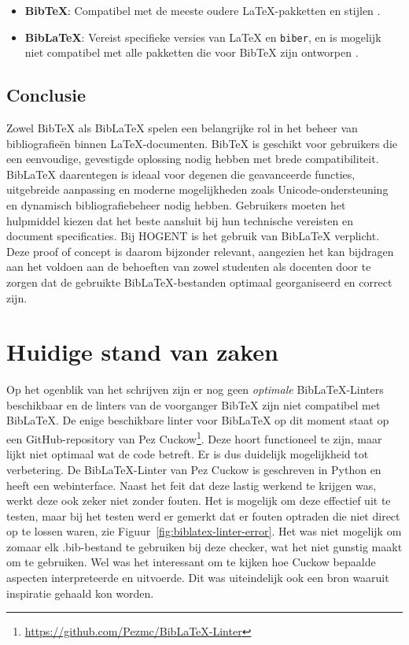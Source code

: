 \begin{itemize}
    \item \textbf{BibTeX}: Compatibel met de meeste oudere \LaTeX{}-pakketten en stijlen \autocite{Patashnik1988}.
    \item \textbf{BibLaTeX}: Vereist specifieke versies van \LaTeX{} en \texttt{biber}, en is mogelijk niet compatibel met alle pakketten die voor BibTeX zijn ontworpen \autocite{Kime2024}.
\end{itemize}

\subsection{Conclusie}
Zowel BibTeX als BibLaTeX spelen een belangrijke rol in het beheer van bibliografieën binnen \LaTeX{}-documenten. BibTeX is geschikt voor gebruikers die een eenvoudige, gevestigde oplossing nodig hebben met brede compatibiliteit. BibLaTeX daarentegen is ideaal voor degenen die geavanceerde functies, uitgebreide aanpassing en moderne mogelijkheden zoals Unicode-ondersteuning en dynamisch bibliografiebeheer nodig hebben. Gebruikers moeten het hulpmiddel kiezen dat het beste aansluit bij hun technische vereisten en document specificaties. Bij HOGENT is het gebruik van BibLaTeX verplicht. Deze proof of concept is daarom bijzonder relevant, aangezien het kan bijdragen aan het voldoen aan de behoeften van zowel studenten als docenten door te zorgen dat de gebruikte BibLaTeX-bestanden optimaal georganiseerd en correct zijn.

\section{Huidige stand van zaken}
Op het ogenblik van het schrijven zijn er nog geen \emph{optimale} BibLaTeX-Linters beschikbaar en de linters van de voorganger BibTeX zijn niet compatibel met BibLaTeX. De enige beschikbare linter voor BibLaTeX op dit moment staat op een GitHub-repository van Pez Cuckow\footnote{\label{foot:pezgithub}\url{https://github.com/Pezmc/BibLaTeX-Linter}}. Deze hoort functioneel te zijn, maar lijkt niet optimaal wat de code betreft. Er is dus duidelijk mogelijkheid tot verbetering. De BibLaTeX-Linter van Pez Cuckow is geschreven in Python en heeft een webinterface. Naast het feit dat deze lastig werkend te krijgen was, werkt deze ook zeker niet zonder fouten. Het is mogelijk om deze effectief uit te testen, maar bij het testen werd er gemerkt dat er fouten optraden die niet direct op te lossen waren, zie Figuur~\ref{fig:biblatex-linter-error}. Het was niet mogelijk om zomaar elk .bib-bestand te gebruiken bij deze checker, wat het niet gunstig maakt om te gebruiken. Wel was het interessant om te kijken hoe Cuckow bepaalde aspecten interpreteerde en uitvoerde. Dit was uiteindelijk ook een bron waaruit inspiratie gehaald kon worden.

